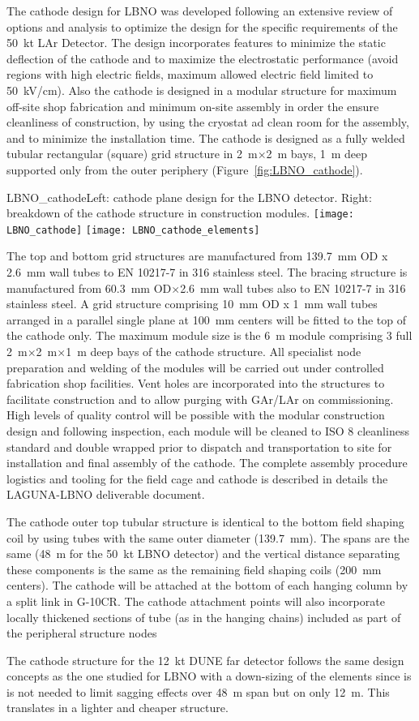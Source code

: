 The cathode design for LBNO was developed following an extensive
review of options and analysis to optimize the design for the specific
requirements of the 50~kt LAr Detector.  The design incorporates
features to minimize the static deflection of the cathode and to
maximize the electrostatic performance (avoid regions with high
electric fields, maximum allowed electric field limited to 50~kV/cm). 
Also the cathode is designed in a modular structure for
maximum off-site shop fabrication and minimum on-site assembly in
order the ensure cleanliness of construction, by using the cryostat ad
clean room for the assembly, and to minimize the installation
time. The cathode is designed as a fully welded tubular rectangular
(square) grid structure in 2~m$\times$2~m bays, 1~m deep supported only from
the outer periphery (Figure~\ref{fig:LBNO_cathode}).  
\begin{cdrfigure}{LBNO_cathode}{\small Left: cathode plane design for the LBNO detector. Right: breakdown of the cathode structure in construction modules.}
\texttt{[image: LBNO\_cathode]} \hfil
\texttt{[image: LBNO\_cathode\_elements]}
\end{cdrfigure}
The top and bottom grid structures are manufactured from 139.7~mm OD x
2.6~mm wall tubes to EN 10217-7 in 316 stainless steel.  The bracing
structure is manufactured from 60.3~mm OD$\times$2.6~mm wall tubes also to EN
10217-7 in 316 stainless steel.  A grid structure comprising 10~mm OD x
1~mm wall tubes arranged in a parallel single plane at 100~mm centers
will be fitted to the top of the cathode only. The maximum module size
is the 6~m module comprising 3 full 2~m$\times$2~m$\times$1~m deep bays
of the cathode structure.  All specialist node preparation and welding
of the modules will be carried out under controlled fabrication shop
facilities.  Vent holes are incorporated into the structures to
facilitate construction and to allow purging with GAr/LAr on
commissioning. High levels of quality control will be possible with
the modular construction design and following inspection, each module
will be cleaned to ISO 8 cleanliness standard and double wrapped prior
to dispatch and transportation to site for installation and final
assembly of the cathode. The complete assembly procedure logistics and
tooling for the field cage and cathode is described in details the
LAGUNA-LBNO deliverable document.

The cathode outer top tubular structure is identical to the bottom
field shaping coil by using tubes with the same outer diameter
(139.7~mm).  The spans are the same (48~m for the 50~kt LBNO detector)
and the vertical distance separating these components is the same as
the remaining field shaping coils (200~mm centers). The cathode will be
attached at the bottom of each hanging column by a split link in
G-10CR. The cathode attachment points will also incorporate locally
thickened sections of tube (as in the hanging chains) included as part
of the peripheral structure nodes


The cathode structure for the 12~kt DUNE far detector follows the
same design concepts as the one studied for LBNO with a down-sizing of
the elements since is is not needed to limit sagging effects over 48~m
span but on only 12~m. This translates in a lighter and cheaper
structure.
